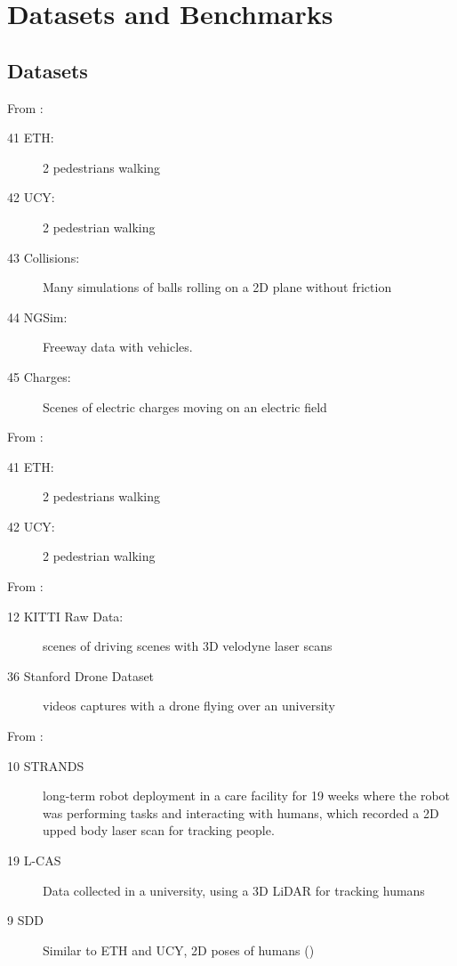 \section{Datasets and Benchmarks}\label{sec: datasets and benchmarks}

\subsection{Datasets}

From \cite{xu2021tra2tra}: 
\begin{description}
	\item[41 ETH:] 2 pedestrians walking
	\item[42 UCY:] 2 pedestrian walking
	\item[43 Collisions:] Many simulations of balls rolling on a 2D plane without friction 
	\item[44 NGSim:] Freeway data with vehicles.
	\item[45 Charges:] Scenes of electric charges moving on an electric field
\end{description}

From \cite{ivanovic2019trajectron,syed2020cnn}:
\begin{description}
	\item[41 ETH:] 2 pedestrians walking
	\item[42 UCY:] 2 pedestrian walking
\end{description}

From \cite{lee2017desire}:
\begin{description}
	\item[12 KITTI Raw Data:] scenes of driving scenes with 3D velodyne laser scans
	\item[36 Stanford Drone Dataset] videos captures with a drone flying over an university
\end{description}

From \cite{sun20183dof}:
\begin{description}
	\item[10 STRANDS] long-term robot deployment in a care facility for 19 weeks where the robot was performing tasks and interacting with humans, which recorded a 2D upped body laser scan for tracking people.
	\item[19 L-CAS] Data collected in a university, using a 3D LiDAR for tracking humans
	\item[9 SDD] Similar to ETH and UCY, 2D poses of humans ()
\end{description}


